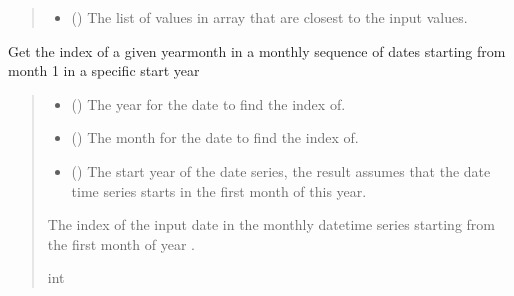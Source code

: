 \documentclass[letterpaper,10pt,english]{sphinxmanual}
\begin{document}
\begin{fulllineitems}
\begin{quote}
\begin{description}
\begin{itemize}
\item {}
\sphinxAtStartPar
{} () \textendash{} The list of values in array that are closest to the input values.

\end{itemize}


\end{description}\end{quote}

\end{fulllineitems}


\begin{fulllineitems}
\label{\detokenize{misc:glomar_gridding.utils.get_date_index}}
\pysigstartsignatures
\pysiglinewithargsret
{}
{\sphinxparamcomma {}\sphinxparamcomma {}}
{}
\pysigstopsignatures
\sphinxAtStartPar
Get the index of a given year\sphinxhyphen{}month in a monthly sequence of dates
starting from month 1 in a specific start year
\begin{quote}\begin{description}
\begin{itemize}
\item {}
\sphinxAtStartPar
{} () \textendash{} The year for the date to find the index of.

\item {}
\sphinxAtStartPar
{} () \textendash{} The month for the date to find the index of.

\item {}
\sphinxAtStartPar
{} () \textendash{} The start year of the date series, the result assumes that the date
time series starts in the first month of this year.

\end{itemize}

\sphinxAtStartPar
{} \textendash{} The index of the input date in the monthly datetime series starting from
the first month of year .

\sphinxAtStartPar
int

\end{description}\end{quote}

\end{fulllineitems}
\end{document}
